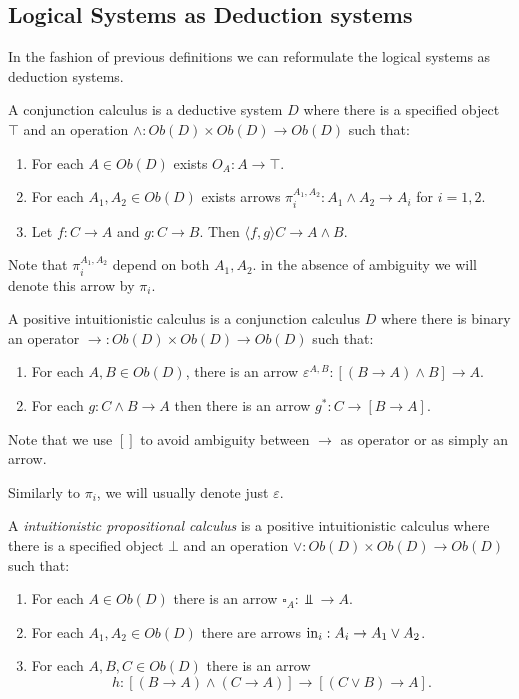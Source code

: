 \subsection{Logical Systems as Deduction systems}
In  the fashion of previous definitions we can reformulate the logical systems as deduction systems.\\
\begin{definition}
  A conjunction calculus is a deductive system $D$ where there is a specified object $\top$ and an operation $\land: Ob(D)\times Ob(D) \to Ob(D)$ such that:
  \begin{enumerate}
  \item For each $A\in Ob(D)$ exists $O_A:A\to \top$.
  \item For each $A_1,A_2\in Ob(D)$ exists arrows $\pi_i^{A_1,A_2}: A_1 \land A_2 \to A_i$ for $i=1,2$.
  \item Let $f:C\to A$ and $g:C\to B$. Then $\langle f,g\rangle C\to A\land B$.
  \end{enumerate}
\end{definition}

Note that $\pi_i^{A_1,A_2}$ depend on both $A_1,A_2$. in the absence of ambiguity we will denote this arrow by $\pi_i$.

\begin{definition} \label{def:positivecalculus}
  A positive intuitionistic calculus is a conjunction calculus $D$ where there is binary an operator $\to: Ob(D)\times Ob(D) \to Ob(D)$ such that:
  \begin{enumerate}
  \item For each $A,B \in Ob(D)$, there is an arrow $\varepsilon^{A,B}: [(B \to A) \land B]\to A$.
  \item For each $g:C\land B \to A$ then there is an arrow $g^*: C\to [B\to A]$.
  \end{enumerate}
\end{definition}
\begin{remark}
  Note that we use $[]$ to avoid ambiguity between $\to$ as operator or as simply an arrow.
\end{remark}
Similarly to $\pi_i$, we will usually denote just $\varepsilon$. 
\begin{definition}
  A \emph{intuitionistic propositional calculus} is a positive intuitionistic calculus where there is a specified object $\bot$ and an operation $\lor: Ob(D)\times Ob(D) \to Ob(D)$ such that:
  \begin{enumerate}
  \item For each $A\in Ob(D)$ there is an arrow $\square_A: \Bot\to A$.
  \item For each $A_1,A_2\in Ob(D)$ there are arrows $\operatorname{in}_i: A_i\to A_1 \lor A_2 $.
  \item For each $A,B,C \in Ob(D)$ there is an arrow $$h:[(B\to A)\land (C\to A)] \to [(C\lor B)\to A].$$
  \end{enumerate}
\end{definition}

